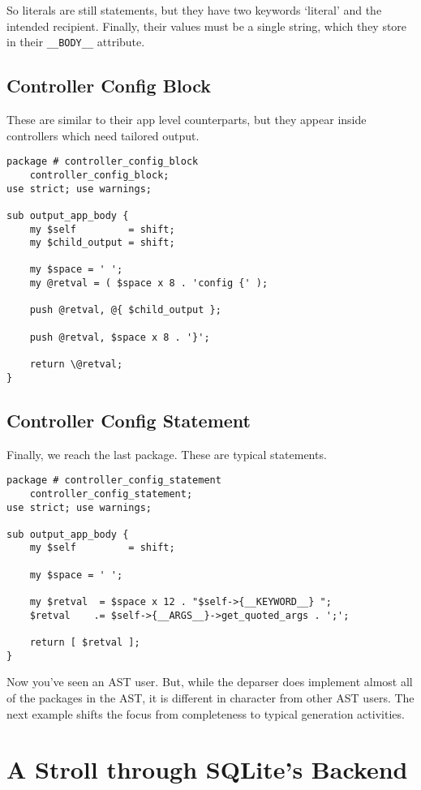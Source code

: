 So literals are still statements, but they have two keywords `literal'
and the intended recipient.  Finally, their values must be a single
string, which they store in their \verb+__BODY__+ attribute.

\subsection*{Controller Config Block}

These are similar to their app level counterparts, but they appear inside
controllers which need tailored output.

\begin{verbatim}
package # controller_config_block
    controller_config_block;
use strict; use warnings;

sub output_app_body {
    my $self         = shift;
    my $child_output = shift;

    my $space = ' ';
    my @retval = ( $space x 8 . 'config {' );

    push @retval, @{ $child_output };

    push @retval, $space x 8 . '}';

    return \@retval;
}
\end{verbatim}

\subsection*{Controller Config Statement}

Finally, we reach the last package.  These are typical statements.

\begin{verbatim}
package # controller_config_statement
    controller_config_statement;
use strict; use warnings;

sub output_app_body {
    my $self         = shift;

    my $space = ' ';

    my $retval  = $space x 12 . "$self->{__KEYWORD__} ";
    $retval    .= $self->{__ARGS__}->get_quoted_args . ';';

    return [ $retval ];
}
\end{verbatim}

Now you've seen an AST user.  But, while the deparser does implement
almost all of the packages in the AST, it is different in character from
other AST users.  The next example shifts the focus from completeness
to typical generation activities.

\section{A Stroll through SQLite's Backend}

